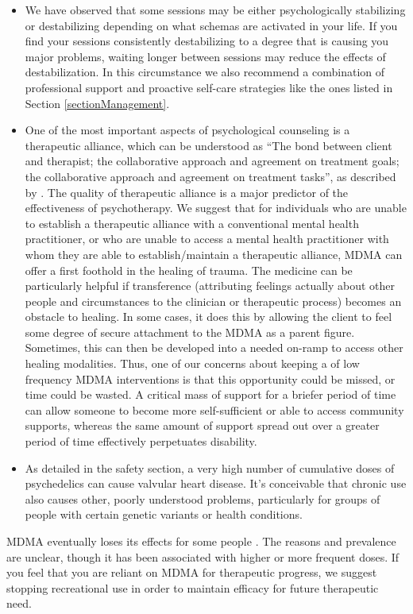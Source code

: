 \documentclass[12pt,letterpaper]{article}
\begin{document}
\begin{itemize}
    \item We have observed that some sessions may be either psychologically stabilizing or destabilizing depending on what schemas are activated in your life. If you find your sessions consistently destabilizing to a degree that is causing you major problems, waiting longer between sessions may reduce the effects of destabilization. In this circumstance we also recommend a combination of professional support and proactive self-care strategies like the ones listed in Section \ref{sectionManagement}.
    \item One of the most important aspects of psychological counseling is a therapeutic alliance, which can be understood as “The bond between client and therapist; the collaborative approach and agreement on treatment goals; the collaborative approach and agreement on treatment tasks”, as described by \textcite{BRWAIdownload}. The quality of therapeutic alliance is a major predictor of the effectiveness of psychotherapy. We suggest that for individuals who are unable to establish a therapeutic alliance with a conventional mental health practitioner, or who are unable to access a mental health practitioner with whom they are able to establish/maintain a therapeutic alliance, MDMA can offer a first foothold in the healing of trauma. The medicine can be particularly helpful if transference (attributing feelings actually about other people and circumstances to the clinician or therapeutic process) becomes an obstacle to healing. In some cases, it does this by allowing the client to feel some degree of secure attachment to the MDMA as a parent figure. Sometimes, this can then be developed into a needed on-ramp to access other healing modalities. Thus, one of our concerns about keeping a of low frequency MDMA interventions is that this opportunity could be missed, or time could be wasted. A critical mass of support for a briefer period of time can allow someone to become more self-sufficient or able to access community supports, whereas the same amount of support spread out over a greater period of time effectively perpetuates disability.
    \item As detailed in the safety section, a very high number of cumulative doses of psychedelics can cause valvular heart disease. It's conceivable that chronic use also causes other, poorly understood problems, particularly for groups of people with certain genetic variants or health conditions.
\end{itemize}

MDMA eventually loses its effects for some people \cite{farreTolerance,parrottTolerance}. The reasons and prevalence are unclear, though it has been associated with higher or more frequent doses. If you feel that you are reliant on MDMA for therapeutic progress, we suggest stopping recreational use in order to maintain efficacy for future therapeutic need.
\end{document}
